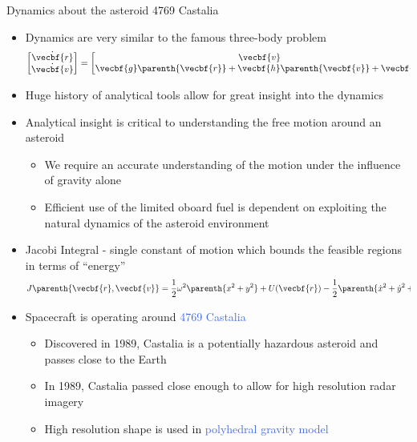 \documentclass[final, usenames, dvipsnames]{beamer}
\newlength{\twocolwidth}
\def\Emph{\textcolor{RoyalBlue}}
\begin{document}
\begin{frame}[t]
\begin{columns}[T,onlytextwidth]
\begin{column}{\twocolwidth}
\begin{block}{Dynamics about the asteroid 4769 Castalia} %
	\begin{minipage}{0.5\columnwidth} %
	\begin{itemize}
		\item Dynamics are very similar to the famous three-body problem
			\[
			\begin{bmatrix} \dot{\vecbf{r}} \\ \dot{\vecbf{v}} \end{bmatrix} =
			\begin{bmatrix}\vecbf{v} \\ \vecbf{g} \parenth{\vecbf{r}} + \vecbf{h}\parenth{\vecbf{v}} + \vecbf{u} \end{bmatrix} 
			\]
		\item Huge history of analytical tools allow for great insight into the dynamics
		\item Analytical insight is critical to understanding the free motion around an asteroid
		\begin{itemize}
			\item We require an accurate understanding of the motion under the influence of gravity alone
			\item Efficient use of the limited oboard fuel is dependent on exploiting the natural dynamics of the asteroid environment
		\end{itemize}
		\item Jacobi Integral - single constant of motion which bounds the feasible regions in terms of ``energy''
			\[
			J \parenth{\vecbf{r}, \vecbf{v}} = \frac{1}{2} \omega^2 \parenth{x^2 + y^2} + U(\vecbf{r}) - \frac{1}{2} \parenth{\dot{x}^2 + \dot{y}^2 + \dot{z}^2} 
			\]
	\end{itemize}
	\end{minipage}%
	\begin{minipage}{0.5\columnwidth}%
        \begin{itemize}
            \item Spacecraft is operating around \Emph{4769 Castalia}
            \begin{itemize}
                \item Discovered in 1989, Castalia is a potentially hazardous asteroid and passes close to the Earth
                \item In 1989, Castalia passed close enough to allow for high resolution radar imagery
                \item High resolution shape is used in \Emph{polyhedral gravity model}

\end{itemize}
\end{itemize}
\end{minipage}
\end{block}
\end{column}
\end{columns}
\end{frame}
\end{document}
